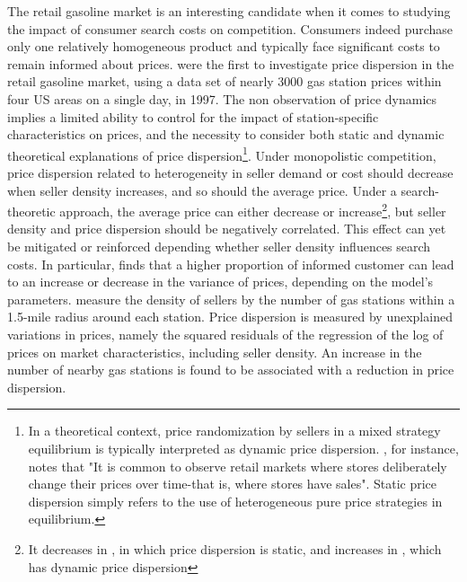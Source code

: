 \documentclass[english]{article}
\begin{document}
The retail gasoline market is an interesting candidate when it comes to studying the impact of consumer search costs on competition. Consumers indeed purchase only one relatively homogeneous product and typically face significant costs to remain informed about prices. \cite{BAR04} were the first to investigate price dispersion in the retail gasoline market, using a data set of nearly 3000 gas station prices within four US areas on a single day, in 1997. The non observation of price dynamics implies a limited ability to control for the impact of station-specific characteristics on prices, and the necessity to consider both static and dynamic theoretical explanations of price dispersion\footnote{In a theoretical context, price randomization by sellers in a mixed strategy equilibrium is typically interpreted as dynamic price dispersion. \cite{VAR80}, for instance, notes that "It is common to observe retail markets where stores deliberately change their prices over time-that is, where stores have sales". Static price dispersion simply refers to the use of heterogeneous pure price strategies in equilibrium.}. Under monopolistic competition, price dispersion related to heterogeneity in seller demand or cost should decrease when seller density increases, and so should the average price. Under a search-theoretic approach, the average price can either decrease or increase\footnote{It decreases in \cite{CAR83}, in which price dispersion is static, and increases in \cite{VAR80}, which has dynamic price dispersion}, but  seller density and price dispersion should be negatively correlated. This effect can yet be mitigated or reinforced depending whether seller density influences search costs. In particular, \cite{VAR80} finds that a higher proportion of informed customer can lead to an increase or decrease in the variance of prices, depending on the model's parameters. \cite{BAR04} measure the density of sellers by the number of gas stations within a 1.5-mile radius around each station. Price dispersion is measured by unexplained variations in prices, namely the squared residuals of the regression of the log of prices on market characteristics, including seller density. An increase in the number of nearby gas stations is found to be associated with a reduction in price dispersion.
\end{document}
